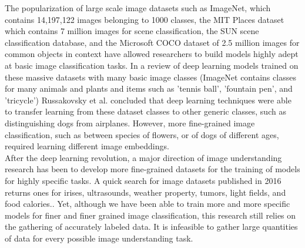 \documentclass[pageno]{jpaper}
\begin{document}
The popularization of large scale image datasets such as ImageNet, which contains 14,197,122 images belonging to 1000 classes\cite{deng2009imagenet}, the MIT Places dataset which contains 7 million images for scene classification\cite{zhou2014learning}, the SUN scene classification database\cite{xiao2010sun}, and the Microsoft COCO dataset of 2.5 million images for common objects in context\cite{lin2014microsoft} have allowed researchers to build models highly adept at basic image classification tasks\cite{russakovsky2013detecting}. In a review of deep learning models trained on these massive datasets with many basic image classes (ImageNet contains classes for many animals and plants and items such as 'tennis ball', 'fountain pen', and 'tricycle') Russakovsky et al. concluded that deep learning techniques were able to transfer learning from these dataset classes to other generic classes, such as distinguishing dogs from airplanes.\cite{russakovsky2013detecting} However, more fine-grained image classification, such as between species of flowers, or of dogs of different ages, required learning different image embeddings.\\

After the deep learning revolution, a major direction of image understanding research has been to develop more fine-grained datasets for the training of models for highly specific tasks. A quick search for image datasets published in 2016 returns ones for irises, ultrasounds, weather property, tumors, light fields, and food calories.\cite{bowyer2016nd}\cite{cortes2016ultrasound}\cite{chu2016image2weather}\cite{shi2016stacked}\cite{paudyal2016smart}\cite{pouladzadeh2015foodd}. Yet, although we have been able to train more and more specific models for finer and finer grained image classification, this research still relies on the gathering of accurately labeled data. It is infeasible to gather large quantities of data for every possible image understanding task.\\
\end{document}
